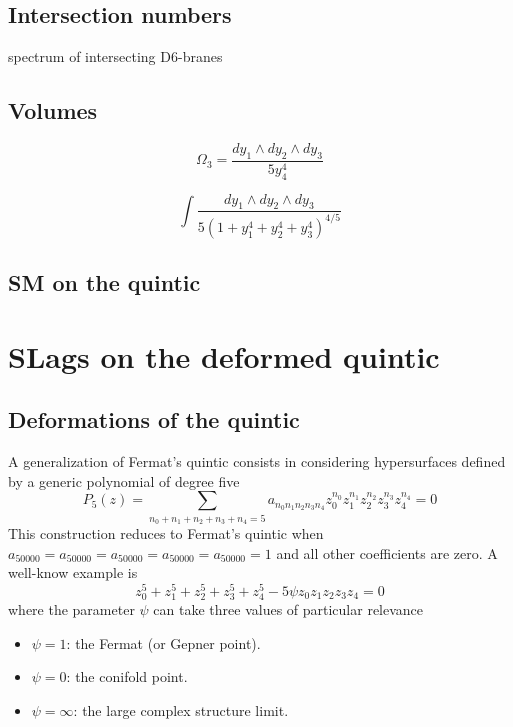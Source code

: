 \subsection{Intersection numbers}
spectrum of intersecting D6-branes

\subsection{Volumes}
\begin{equation}
  \Omega_3=\frac{dy_1\wedge dy_2\wedge dy_3}{5y_4^4}
\end{equation}


\begin{equation}
  \int \frac{dy_1\wedge dy_2\wedge dy_3}{5(1+y_1^4+y_2^4+y_3^4)^{4/5}}
\end{equation}

\subsection{SM on the quintic}

\section{SLags on the deformed quintic}

\subsection{Deformations of the quintic}

A generalization of Fermat's quintic consists in considering hypersurfaces defined by a generic polynomial of degree five
\begin{equation}
  P_5(z)=\sum_{n_0+n_1+n_2+n_3+n_4=5} a_{n_0 n_1 n_2 n_3 n_4} z_0^{n_0}z_1^{n_1}z_2^{n_2}z_3^{n_3}z_4^{n_4}=0
\end{equation}
This construction reduces to Fermat's quintic when $a_{50000}=a_{50000}=a_{50000}=a_{50000}=a_{50000}=1$ and all other coefficients are zero.
A well-know example is
\begin{equation}
  z_0^5+z_1^5+z_2^5+z_3^5+z_4^5- 5\psi z_0z_1z_2z_3z_4=0
\end{equation}
 where the parameter $\psi$ can take three values of particular relevance
\begin{itemize}
  \item $\psi=1$: the Fermat (or Gepner point).
  \item $\psi=0$: the conifold point.
  \item $\psi=\infty$: the large complex structure limit.
\end{itemize}

